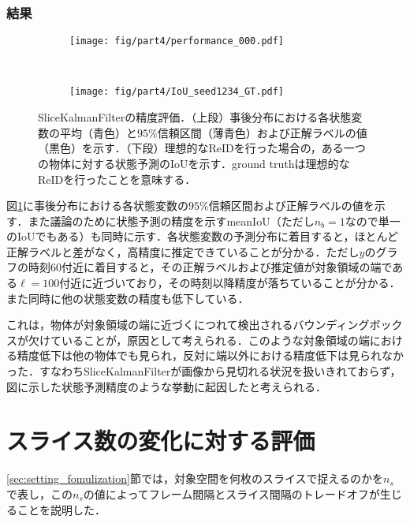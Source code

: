         \subsubsection{結果}

        \begin{figure}[t]
            \begin{subfigure}[t]{\linewidth}
                \centering
                \texttt{[image: fig/part4/performance\_000.pdf]}
            \end{subfigure}
            \\
            \begin{subfigure}[t]{\linewidth}
                \centering
                \texttt{[image: fig/part4/IoU\_seed1234\_GT.pdf]}
            \end{subfigure}
            \caption[SliceKalmanFilterの精度評価]{SliceKalmanFilterの精度評価．（上段）事後分布における各状態変数の平均（青色）と$95\%$信頼区間（薄青色）および正解ラベルの値（黒色）を示す．（下段）理想的なReIDを行った場合の，ある一つの物体に対する状態予測のIoUを示す．ground truthは理想的なReIDを行ったことを意味する．}
            \label{fig:SKF_evaluation}
        \end{figure}

        図\ref{fig:SKF_evaluation}に事後分布における各状態変数の$95\%$信頼区間および正解ラベルの値を示す．また議論のために状態予測の精度を示すmeanIoU（ただし$n_b = 1$なので単一のIoUでもある）も同時に示す．各状態変数の予測分布に着目すると，ほとんど正解ラベルと差がなく，高精度に推定できていることが分かる．ただし$y$のグラフの時刻$60$付近に着目すると，その正解ラベルおよび推定値が対象領域の端である$\ell = 100$付近に近づいており，その時刻以降精度が落ちていることが分かる．また同時に他の状態変数の精度も低下している．

        これは，物体が対象領域の端に近づくにつれて検出されるバウンディングボックスが欠けていることが，原因として考えられる．このような対象領域の端における精度低下は他の物体でも見られ，反対に端以外における精度低下は見られなかった．すなわちSliceKalmanFilterが画像から見切れる状況を扱いきれておらず，図に示した状態予測精度のような挙動に起因したと考えられる．

\section{スライス数の変化に対する評価}
\label{sec:number_of_slice_effect}

\ref{sec:setting_fomulization}節では，対象空間を何枚のスライスで捉えるのかを$n_s$で表し，この$n_s$の値によってフレーム間隔とスライス間隔のトレードオフが生じることを説明した．

